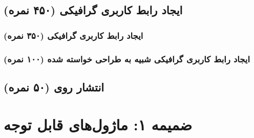 \documentclass[a4paper]{report}
\begin{document}
\section{ایجاد رابط کاربری گرافیکی (۴۵۰ نمره)}
\subsection{ایجاد رابط کاربری گرافیکی (۳۵۰ نمره)}


\subsection{ایجاد رابط کاربری گرافیکی شبیه به طراحی خواسته شده (۱۰۰ نمره)}


\section{انتشار روی  (۵۰ نمره)}


\chapter{ضمیمه ۱: ماژول‌های قابل توجه}
\end{document}

